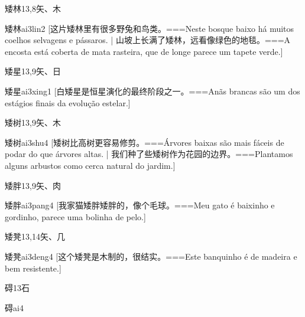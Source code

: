\begin{Entry}{矮林}{13,8}{⽮、⽊}
  \begin{Phonetics}{矮林}{ai3lin2}
    [这片矮林里有很多野兔和鸟类。===Neste bosque baixo há muitos coelhos selvagens e pássaros. | 山坡上长满了矮林，远看像绿色的地毯。===A encosta está coberta de mata rasteira, que de longe parece um tapete verde.]
  \end{Phonetics}
\end{Entry}

\begin{Entry}{矮星}{13,9}{⽮、⽇}
  \begin{Phonetics}{矮星}{ai3xing1}
    [白矮星是恒星演化的最终阶段之一。===Anãs brancas são um dos estágios finais da evolução estelar.]
  \end{Phonetics}
\end{Entry}

\begin{Entry}{矮树}{13,9}{⽮、⽊}
  \begin{Phonetics}{矮树}{ai3shu4}
    [矮树比高树更容易修剪。===Árvores baixas são mais fáceis de podar do que árvores altas. | 我们种了些矮树作为花园的边界。===Plantamos alguns arbustos como cerca natural do jardim.]
  \end{Phonetics}
\end{Entry}

\begin{Entry}{矮胖}{13,9}{⽮、⾁}
  \begin{Phonetics}{矮胖}{ai3pang4}
    [我家猫矮胖矮胖的，像个毛球。===Meu gato é baixinho e gordinho, parece uma bolinha de pelo.]
  \end{Phonetics}
\end{Entry}

\begin{Entry}{矮凳}{13,14}{⽮、⼏}
  \begin{Phonetics}{矮凳}{ai3deng4}
    [这个矮凳是木制的，很结实。===Este banquinho é de madeira e bem resistente.]
  \end{Phonetics}
\end{Entry}

\begin{Entry}{碍}{13}{⽯}
  \begin{Phonetics}{碍}{ai4}
  \end{Phonetics}
\end{Entry}

